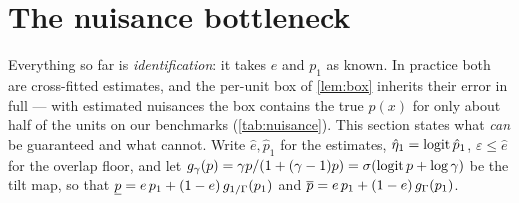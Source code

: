 \section{The nuisance bottleneck}
\label{sec:nuisance}

Everything so far is \emph{identification}: it takes $e$ and $p_1$ as known.
In practice both are cross-fitted estimates, and the per-unit box of
\cref{lem:box} inherits their error in full --- with estimated nuisances the box
contains the true $p(x)$ for only about half of the units on our benchmarks
(\cref{tab:nuisance}). This section states what \emph{can} be guaranteed and
what cannot. Write $\hat e,\hat p_1$ for the estimates, $\hat\eta_1=\operatorname{logit}\hat p_1$,
$\varepsilon\le\hat e$ for the overlap floor, and let
$g_\gamma(p)=\gamma p/(1+(\gamma-1)p)=\sigma(\operatorname{logit} p+\log\gamma)$ be the tilt
map, so that $\underline{p} = e\,p_1+(1-e)\,g_{1/\Gamma}(p_1)$ and
$\overline{p} = e\,p_1+(1-e)\,g_{\Gamma}(p_1)$.

